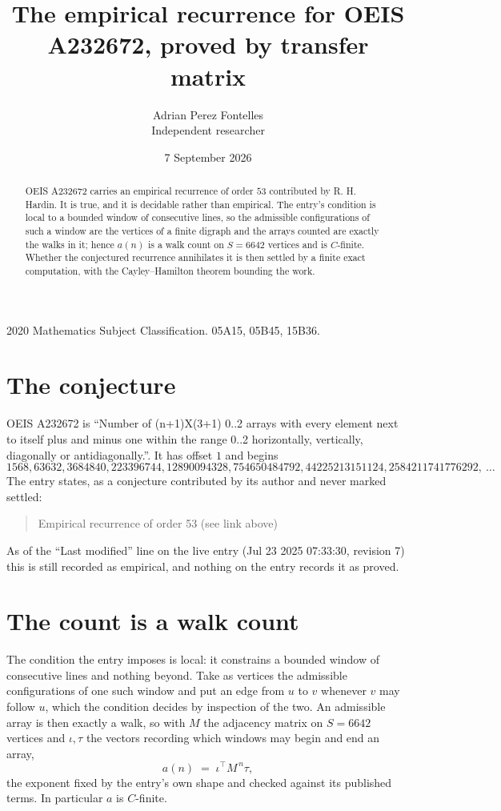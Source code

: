 \documentclass[11pt,a4paper]{article}
\title{The empirical recurrence for OEIS A232672, proved by transfer matrix}
\author{Adrian Perez Fontelles\\ \small Independent researcher}
\date{7 September 2026}
\theoremstyle{plain}
\theoremstyle{definition}
\begin{document}
\maketitle

\begin{abstract}
OEIS A232672 carries an empirical recurrence of order $53$ contributed by R. H. Hardin. It is
true, and it is decidable rather than empirical. The entry's condition is local to a bounded window of consecutive lines, so
the admissible configurations of such a window are the vertices of a finite digraph and the
arrays counted are exactly the walks in it; hence $a(n)$ is a walk count on $S=6642$ vertices
and is $C$-finite. Whether the conjectured recurrence annihilates it is then settled by a
finite exact computation, with the Cayley--Hamilton theorem bounding the work.
\end{abstract}

\noindent\small 2020 Mathematics Subject Classification. 05A15, 05B45, 15B36.\normalsize

\section{The conjecture}

OEIS A232672 is ``Number of (n+1)X(3+1) 0..2 arrays with every element next to itself plus and minus one within the range 0..2 horizontally, vertically, diagonally or antidiagonally.''. It has offset $1$ and begins
\[
1568, 63632, 3684840, 223396744, 12890094328, 754650484792, 44225213151124, 2584211741776292,\ \dots
\]
The entry states, as a conjecture contributed by its author and never marked settled:
\begin{quote}
Empirical recurrence of order 53 (see link above)
\end{quote}
As of the ``Last modified'' line on the live entry (Jul 23 2025 07:33:30, revision 7) this is still
recorded as empirical, and nothing on the entry records it as proved.

\section{The count is a walk count}

The condition the entry imposes is local: it constrains a bounded window of consecutive lines and nothing beyond. Take as
vertices the admissible configurations of one such window and put an edge from $u$ to $v$
whenever $v$ may follow $u$, which the condition decides by inspection of the two. An
admissible array is then exactly a walk, so with $M$ the adjacency matrix on $S=6642$ vertices
and $\iota,\tau$ the vectors recording which windows may begin and end an array,
\[
a(n)\;=\;\iota^{\!\top}M^{\,n}\tau ,
\]
the exponent fixed by the entry's own shape and checked against its published terms. In
particular $a$ is $C$-finite.
\end{document}

